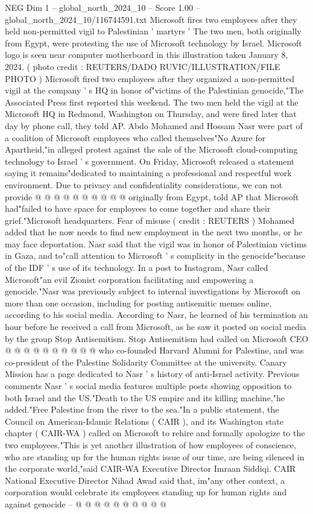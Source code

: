 \begin{textsample}{NEG Dim 1 – global\_north\_2024\_10 – Score 1.00 – global\_north\_2024\_10/116744591.txt}  \label{ex:f1_neg_076}
Microsoft fires two employees after they held non-permitted vigil to Palestinian ' martyrs ' The two men, both originally from Egypt, were protesting the use of Microsoft technology by Israel.
Microsoft logo is seen near computer motherboard in this illustration taken January 8, 2024. ( photo credit : REUTERS/DADO RUVIC/ILLUSTRATION/FILE PHOTO ) Microsoft fired two employees after they organized a non-permitted vigil at the company ' s HQ in honor of"victims of the Palestinian genocide,"The Associated Press first reported this weekend.
The two men held the vigil at the Microsoft HQ in Redmond, Washington on Thursday, and were fired later that day by phone call, they told AP.
Abdo Mohamed and Hossam Nasr were part of a coalition of Microsoft employees who called themselves"No Azure for Apartheid,"in alleged protest against the sale of the Microsoft cloud-computing technology to Israel ' s government.
On Friday, Microsoft released a statement saying it remains"dedicated to maintaining a professional and respectful work environment.
Due to privacy and confidentiality considerations, we can not provide @ @ @ @ @ @ @ @ @ @ originally from Egypt, told AP that Microsoft had"failed to have space for employees to come together and share their grief."Microsoft headquarters.
Fear of misuse ( credit : REUTERS ) Mohamed added that he now needs to find new employment in the next two months, or he may face deportation.
Nasr said that the vigil was in honor of Palestinian victims in Gaza, and to"call attention to Microsoft ' s complicity in the genocide"because of the IDF ' s use of its technology.
In a post to Instagram, Nasr called Microsoft"an evil Zionist corporation facilitating and empowering a genocide."Nasr was previously subject to internal investigations by Microsoft on more than one occasion, including for posting antisemitic memes online, according to his social media.
According to Nasr, he learned of his termination an hour before he received a call from Microsoft, as he saw it posted on social media by the group Stop Antisemitism.
Stop Antisemitism had called on Microsoft CEO @ @ @ @ @ @ @ @ @ @ who co-founded Harvard Alumni for Palestine, and was co-president of the Palestine Solidarity Committee at the university.
Canary Mission has a page dedicated to Nasr ' s history of anti-Israel activity.
Previous comments Nasr ' s social media features multiple posts showing opposition to both Israel and the US."Death to the US empire and its killing machine,"he added."Free Palestine from the river to the sea."In a public statement, the Council on American-Islamic Relations ( CAIR ), and its Washington state chapter ( CAIR-WA ) called on Microsoft to rehire and formally apologize to the two employees."This is yet another illustration of how employees of conscience, who are standing up for the human rights issue of our time, are being silenced in the corporate world,"said CAIR-WA Executive Director Imraan Siddiqi.
CAIR National Executive Director Nihad Awad said that, im"any other context, a corporation would celebrate its employees standing up for human rights and against genocide -- @ @ @ @ @ @ @ @ @ @

\end{textsample}
